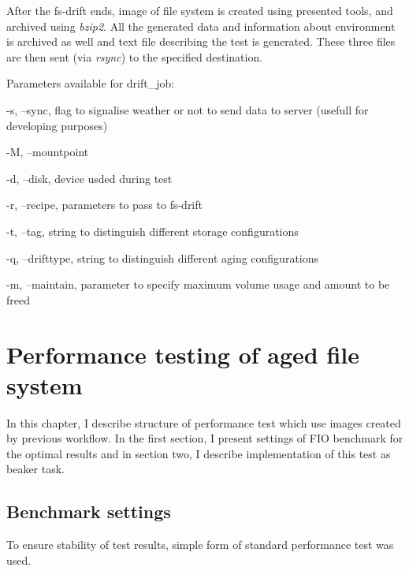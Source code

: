 \documentclass[
  color, %
  table, %
  lof,   %
  lot,   %
]{fithesis3}
\begin{document}

After the fs-drift ends, image of file system is created using presented tools, and archived using \textit{bzip2}. All the generated data and information about environment is archived as well and text file describing the test is generated. These three files are then sent (via \textit{rsync}) to the specified destination.

Parameters available for drift\_job:
\begin{compactenum}
  \item -s, --sync, flag to signalise weather or not to send data to server (usefull for developing purposes)
  \item -M, --mountpoint
  \item -d, --disk, device usded during test
  \item -r, --recipe, parameters to pass to fs-drift
  \item -t, --tag, string to distinguish different storage configurations
  \item -q, --drifttype, string to distinguish different aging configurations
  \item -m, --maintain, parameter to specify maximum volume usage and amount to be freed
  \end{compactenum}

\chapter{Performance testing of aged file system}
In this chapter, I describe structure of performance test which use images created by previous workflow. In the first section, I present settings of FIO benchmark for the optimal results and in section two, I describe implementation of this test as beaker task.

\section{Benchmark settings}
To ensure stability of test results, simple form of standard performance test was used.
\end{document}
